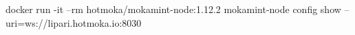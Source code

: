 \begin{shellcommandbox}\begin{ttlst}
docker run -it --rm hotmoka/mokamint-node:1.12.2 mokamint-node config show --uri=ws://lipari.hotmoka.io:8030
\end{ttlst}\end{shellcommandbox}
